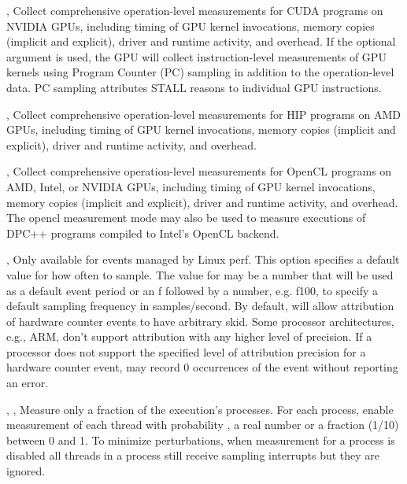 \documentclass[english]{article}
\begin{document}
\begin{Description}
\item[\OptArg{-e}{gpu=nvidia\Lbr,pc\Rbr}, \OptArg{--event}{gpu=nvidia\Lbr,pc\Rbr}]
Collect comprehensive operation-level measurements for CUDA programs on NVIDIA 
GPUs, including timing of GPU kernel invocations, memory copies (implicit and 
explicit), driver and runtime activity, and overhead.
If the optional argument  is used, the GPU will collect 
instruction-level measurements of GPU kernels using Program Counter (PC) 
sampling in addition to the operation-level data.  
PC sampling attributes STALL reasons to individual GPU instructions.

\item[\OptArg{-e}{gpu=amd}, \OptArg{--event}{gpu=amd}]
Collect comprehensive operation-level measurements for HIP programs on AMD GPUs,
including timing of GPU kernel invocations, memory copies 
(implicit and explicit), driver and runtime activity, and overhead.

\item[\OptArg{-e}{gpu=opencl}, \OptArg{--event}{gpu=opencl}]
Collect comprehensive operation-level measurements for OpenCL programs on AMD, 
Intel, or NVIDIA GPUs, including timing of GPU kernel invocations, memory 
copies (implicit and explicit), driver and runtime activity, and overhead. 
The opencl measurement mode may also be used to measure executions of DPC++ 
programs compiled to Intel's OpenCL backend.

\item[\OptArg{-c}{howoften}, \OptArg{--count}{howoften}]
                       Only available for events managed by Linux perf. This option
                       specifies a default value for how often to sample. The value for  may be a number that will be used as a default
                       event period or an f followed by a number, e.g. f100, to specify a default sampling frequency in samples/second.
\medskip
By default,  will allow attribution of hardware counter events to have arbitrary skid. 
Some processor architectures, e.g., ARM,  don't support attribution with any higher level of precision.
If a processor does not support the specified level of attribution precision for a hardware counter event, 
 may record 0 occurrences of the event without reporting an error.

\item[\OptArg{-f}{frac}, \OptArg{-fp}{frac}, \OptArg{--process-fraction}{frac}]
Measure only a fraction  of the execution's processes.
For each process, enable measurement of each thread with probability , a real number or a fraction (1/10) between 0 and 1.
To minimize perturbations, when measurement for a process is disabled
all threads in a process still receive sampling interrupts but they are ignored.


\end{Description}
\end{document}
